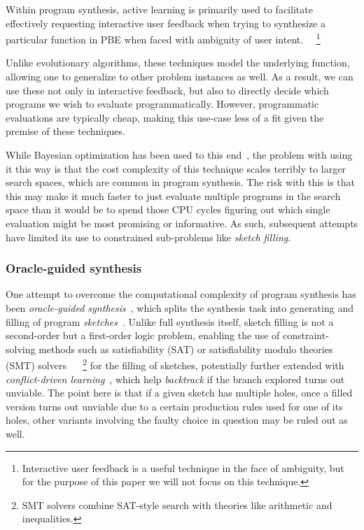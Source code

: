 \documentclass{article}
\begin{document}
Within program synthesis, active learning is primarily used to
facilitate effectively requesting interactive user feedback when
trying to synthesize a particular function in PBE when faced
with ambiguity of user intent.~\citep{shen2019using}%
~\footnote{
    Interactive user feedback is a useful technique in the face of ambiguity,
    but for the purpose of this paper we will not focus on this technique.
}

Unlike evolutionary algorithms, these techniques model the underlying function,
allowing one to generalize to other problem instances as well.
As a result, we can use these not only in interactive feedback,
but also to directly decide which programs we wish to evaluate programmatically.
However, programmatic evaluations are typically cheap,
making this use-case less of a fit given the premise of these techniques.

While Bayesian optimization has been used to this end~\citep{looks2005learning},
the problem with using it this way is that the cost complexity of this technique
scales terribly to larger search spaces, which are common in program synthesis.
The risk with this is that this may make it much faster to just evaluate
multiple programs in the search space than it would be to spend those CPU cycles
figuring out which single evaluation might be most promising or informative.
As such, subsequent attempts have limited its use to constrained
sub-problems like \emph{sketch filling}.~\citep{verma2018programmatically}

\subsubsection{Oracle-guided synthesis}

One attempt to overcome the computational complexity of program synthesis
has been \emph{oracle-guided synthesis}~\citep{solar2008program},
which splits the synthesis task into generating and filling of program
\emph{sketches}~\citep{murali2017neural}.
Unlike full synthesis itself, sketch filling is not a second-order but a
first-order logic problem, enabling the use of constraint-solving methods
such as satisfiability (SAT) or satisfiability modulo theories (SMT) solvers%
~\citep{akiba2013calibrating,alur2013syntax,alur2016sygus,rosette,architecture}%
~\footnote{
    SMT solvers combine SAT-style search with theories like arithmetic and inequalities.
} for the filling of sketches, potentially further extended with
\emph{conflict-driven learning}~\citep{feng2018program,hornclauses},
which help \emph{backtrack} if the branch explored turns out unviable.
The point here is that if a given sketch has multiple holes,
once a filled version turns out unviable due to a certain production rules used for one of its holes,
other variants involving the faulty choice in question may be ruled out as well.
\end{document}
